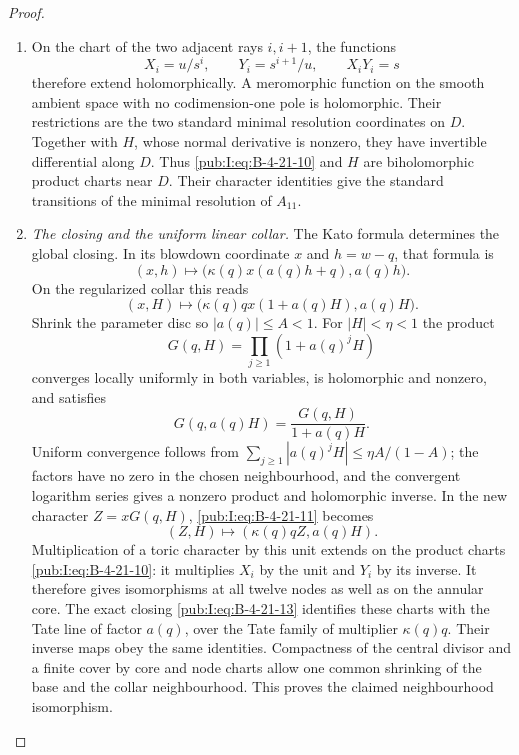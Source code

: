 \begin{proof}
\begin{enumerate}[label=\arabic*.,leftmargin=*]
\item On the chart of the two adjacent rays $i,i+1$, the functions
\begin{equation}
 X_i=u/s^i,\qquad Y_i=s^{i+1}/u,
 \qquad X_iY_i=s
\label{pub:I:eq:B-4-21-10}
\end{equation}
therefore extend holomorphically.  A meromorphic function on
the smooth ambient space with no codimension-one pole is
holomorphic.  Their restrictions are the two standard minimal
resolution coordinates on $D$.  Together with $H$, whose
normal derivative is nonzero, they have invertible differential
along $D$.  Thus \eqref{pub:I:eq:B-4-21-10} and $H$ are biholomorphic
product charts near $D$.  Their character identities give the
standard transitions of the minimal resolution of $A_{11}$.

\item \emph{The closing and the uniform linear collar.}
The Kato formula determines the global closing. In its blowdown coordinate $x$
and $h=w-q$, that formula is
\[
 (x,h)\longmapsto
 \bigl(\kappa(q)x(a(q)h+q),a(q)h\bigr).
\]
On the regularized collar this reads
\begin{equation}
 (x,H)\longmapsto
 \bigl(\kappa(q)q x(1+a(q)H),a(q)H\bigr).
\label{pub:I:eq:B-4-21-11}
\end{equation}
Shrink the parameter disc so $|a(q)|\le A<1$.
For $|H|<\eta<1$ the product
\begin{equation}
 G(q,H)=\prod_{j\ge1}(1+a(q)^jH)
\label{pub:I:eq:B-4-21-12}
\end{equation}
converges locally uniformly in both variables, is holomorphic
and nonzero, and satisfies
\[
 G(q,a(q)H)=\frac{G(q,H)}{1+a(q)H}.
\]
Uniform convergence follows from
$\sum_{j\ge1}|a(q)^jH|\le\eta A/(1-A)$; the factors have
no zero in the chosen neighbourhood, and the convergent
logarithm series gives a nonzero product and holomorphic inverse.
In the new character $Z=xG(q,H)$, \eqref{pub:I:eq:B-4-21-11} becomes
\begin{equation}
 (Z,H)\longmapsto
       (\kappa(q)qZ,a(q)H).
\label{pub:I:eq:B-4-21-13}
\end{equation}
Multiplication of a toric character by this unit extends on
the product charts \eqref{pub:I:eq:B-4-21-10}: it multiplies $X_i$ by the
unit and $Y_i$ by its inverse.  It therefore gives 
isomorphisms at all twelve nodes as well as on the annular
core.  The exact closing \eqref{pub:I:eq:B-4-21-13} identifies these charts
with the Tate line of factor $a(q)$, over the Tate family
of multiplier $\kappa(q)q$.  Their inverse maps obey the
same identities.  Compactness of the central divisor and
a finite cover by core and node charts allow one common
shrinking of the base and the collar neighbourhood.
This proves the claimed neighbourhood isomorphism.


\end{enumerate}
\end{proof}
